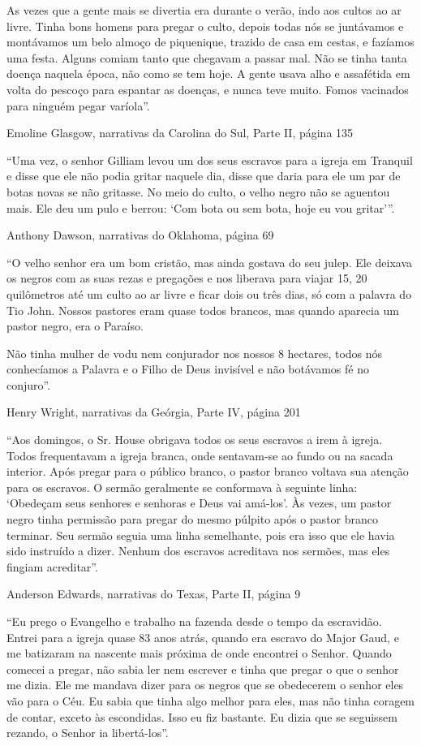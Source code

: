 As vezes que a gente mais se divertia era durante o verão, indo aos
cultos ao ar livre. Tinha bons homens para pregar o culto, depois todas
nós se juntávamos e montávamos um belo almoço de piquenique, trazido de
casa em cestas, e fazíamos uma festa. Alguns comiam tanto que chegavam a
passar mal. Não se tinha tanta doença naquela época, não como se tem
hoje. A gente usava alho e assafétida em volta do pescoço para espantar
as doenças, e nunca teve muito. Fomos vacinados para ninguém pegar
varíola''.

Emoline Glasgow, narrativas da Carolina do Sul, Parte II, página 135

``Uma vez, o senhor Gilliam levou um dos seus escravos para a igreja em
Tranquil e disse que ele não podia gritar naquele dia, disse que daria
para ele um par de botas novas se não gritasse. No meio do culto, o
velho negro não se aguentou mais. Ele deu um pulo e berrou: `Com bota ou
sem bota, hoje eu vou gritar'''.

Anthony Dawson, narrativas do Oklahoma, página 69

``O velho senhor era um bom cristão, mas ainda gostava do seu julep. Ele
deixava os negros com as suas rezas e pregações e nos liberava para
viajar 15, 20 quilômetros até um culto ao ar livre e ficar dois ou três
dias, só com a palavra do Tio John. Nossos pastores eram quase todos
brancos, mas quando aparecia um pastor negro, era o Paraíso.

Não tinha mulher de vodu nem conjurador nos nossos 8 hectares, todos nós
conhecíamos a Palavra e o Filho de Deus invisível e não botávamos fé no
conjuro''.

Henry Wright, narrativas da Geórgia, Parte IV, página 201

``Aos domingos, o Sr. House obrigava todos os seus escravos a irem à
igreja. Todos frequentavam a igreja branca, onde sentavam-se ao fundo ou
na sacada interior. Após pregar para o público branco, o pastor branco
voltava sua atenção para os escravos. O sermão geralmente se conformava
à seguinte linha: `Obedeçam seus senhores e senhoras e Deus vai
amá-los'. Às vezes, um pastor negro tinha permissão para pregar do mesmo
púlpito após o pastor branco terminar. Seu sermão seguia uma linha
semelhante, pois era isso que ele havia sido instruído a dizer. Nenhum
dos escravos acreditava nos sermões, mas eles fingiam acreditar''.

Anderson Edwards, narrativas do Texas, Parte II, página 9

``Eu prego o Evangelho e trabalho na fazenda desde o tempo da
escravidão. Entrei para a igreja quase 83 anos atrás, quando era escravo
do Major Gaud, e me batizaram na nascente mais próxima de onde encontrei
o Senhor. Quando comecei a pregar, não sabia ler nem escrever e tinha
que pregar o que o senhor me dizia. Ele me mandava dizer para os negros
que se obedecerem o senhor eles vão para o Céu. Eu sabia que tinha algo
melhor para eles, mas não tinha coragem de contar, exceto às escondidas.
Isso eu fiz bastante. Eu dizia que se seguissem rezando, o Senhor ia
libertá-los''.

